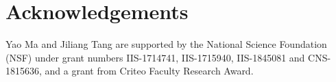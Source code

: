 \documentclass[sigconf]{acmart}
\begin{document}
\section{Acknowledgements}
Yao Ma and Jiliang Tang are supported by the National Science Foundation (NSF) under grant numbers IIS-1714741, IIS-1715940, IIS-1845081 and CNS-1815636, and a grant from Criteo Faculty Research Award. 

























\balance


\end{document}

